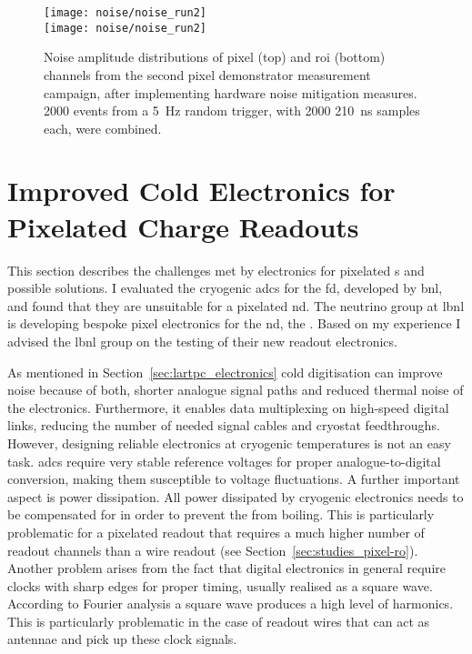 \begin{figure}[htb]
	\centering
	\texttt{[image: noise/noise\_run2]} \\
	\texttt{[image: noise/noise\_run2]}
	\caption[Noise distributions from second pixel demonstrator measurement campaign]{%
		Noise amplitude distributions of pixel (top) and \acrshort{roi} (bottom) channels from the second pixel demonstrator measurement campaign, after implementing hardware noise mitigation measures.
		\num{2000} events from a \SI{5}{\hertz} random trigger, with \num{2000} \SI{210}{\nano\second} samples each, were combined.
	}
	\label{fig:electronics_noise-run2}
\end{figure}


\section{Improved Cold Electronics for Pixelated Charge Readouts}
\label{sec:studies_pixel-electronics}


This section describes the challenges met by electronics for pixelated \lartpc{}s and possible solutions.
I evaluated the cryogenic \glspl{adc} for the \dune{} \gls{fd}, developed by \gls{bnl}, and found that they are unsuitable for a pixelated \gls{nd}.
The neutrino group at \gls{lbnl} is developing bespoke pixel electronics for the \gls{nd}, the \larpix{}.
Based on my experience I advised the \gls{lbnl} group on the testing of their new readout electronics.

As mentioned in Section~\ref{sec:lartpc_electronics} cold digitisation can improve noise because of both, shorter analogue signal paths and reduced thermal noise of the electronics.
Furthermore, it enables data multiplexing on high-speed digital links, reducing the number of needed signal cables and cryostat feedthroughs.
However, designing reliable electronics at cryogenic temperatures is not an easy task.
\glspl{adc} require very stable reference voltages for proper analogue-to-digital conversion, making them susceptible to voltage fluctuations.
A further important aspect is power dissipation.
All power dissipated by cryogenic electronics needs to be compensated for in order to prevent the \lar{} from boiling.
This is particularly problematic for a pixelated readout that requires a much higher number of readout channels than a wire readout (see Section~\ref{sec:studies_pixel-ro}).
Another problem arises from the fact that digital electronics in general require clocks with sharp edges for proper timing, usually realised as a square wave.
According to Fourier analysis a square wave produces a high level of harmonics.
This is particularly problematic in the case of readout wires that can act as antennae and pick up these clock signals.


